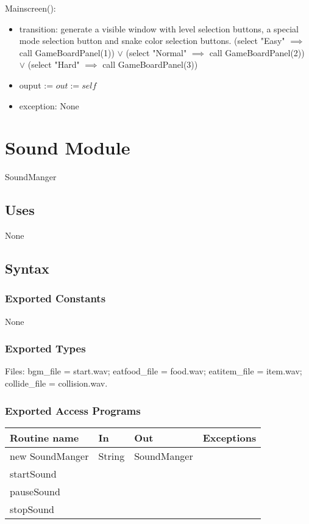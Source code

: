 \documentclass[12pt, titlepage]{article}
\begin{document}
\noindent Mainscreen():
\begin{itemize}
\item transition: generate a visible window with level selection buttons, a special mode selection button and snake color selection buttons. (select "Easy" $\implies$ call GameBoardPanel(1)) $\lor$ (select "Normal" $\implies$ call GameBoardPanel(2)) $\lor$ (select "Hard" $\implies$ call GameBoardPanel(3)) 
\item ouput := $\mathit{out} := \mathit{self}$
\item exception: None\\
\end{itemize}
\section{Sound Module}

SoundManger

\subsection* {Uses}

None

\subsection* {Syntax}

\subsubsection* {Exported Constants}

None

\subsubsection* {Exported Types}
Files:
bgm\_file = start.wav;
eatfood\_file = food.wav;
eatitem\_file = item.wav;
collide\_file = collision.wav.
\subsubsection* {Exported Access Programs}

\begin{tabular}{| l | l | l | l |}
\hline
\textbf{Routine name} & \textbf{In} & \textbf{Out} & \textbf{Exceptions}\\
\hline
new SoundManger & String & SoundManger &\\
\hline
startSound &  &  & \\
\hline
pauseSound &  &  & \\
\hline
stopSound &  &  & \\
\hline
\end{tabular}
\end{document}
